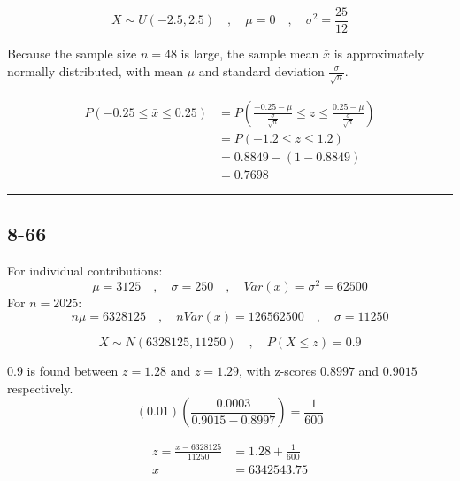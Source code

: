 \documentclass{article}
\newcommand{\qline}{\par\noindent\rule{4.5in}{1pt}}
\begin{document}
			\[
				X \sim U(-2.5,2.5) \quad,\quad \mu = 0 \quad,\quad \sigma^2 = \frac{25}{12}
			\]

			\begin{center}
				Because the sample size $n=48$ is large, the sample mean $\bar{x}$ is approximately normally distributed, with mean $\mu$ and standard deviation $\frac{\sigma}{\sqrt{n}}$.
			\end{center}

			\begin{equation*}
				\begin{split}
					 P(-0.25 \leq \bar{x} \leq 0.25) &= P\left( \frac{-0.25 - \mu}{\frac{\sigma}{\sqrt{n}}} \leq z \leq \frac{0.25 - \mu}{\frac{\sigma}{\sqrt{n}}} \right) \\
					 &= P(-1.2 \leq z \leq 1.2) \\
					 &= 0.8849 - (1 - 0.8849) \\
					 &= \boxed{\num{0.7698}}
				\end{split}
			\end{equation*}

	\qline

		\subsection*{8-66}

			\begin{center}
				For individual contributions:
				\[
					\mu = 3125 \quad,\quad \sigma = 250 \quad,\quad Var(x) = \sigma^2 = 62500
				\]
				For $n = 2025$:
				\[
					n\mu = 6328125 \quad,\quad nVar(x) = 126562500 \quad,\quad \sigma = 11250
				\]
			\end{center}

			\[
				X \sim N(6328125, 11250) \quad,\quad P(X \leq z) = 0.9
			\]
			\begin{center}
				$0.9$ is found between $z=1.28$ and $z=1.29$, with z-scores $0.8997$ and $0.9015$ respectively. \\
				\[
					(0.01)(\frac{0.0003}{0.9015-0.8997}) = \frac{1}{600}
				\]
			\end{center}
			\par
			\begin{equation*}
				\begin{split}
					z = \frac{x - 6328125}{11250} &= 1.28 + \frac{1}{600} \\
					x &= \boxed{\num{6342543.75}}
				\end{split}
			\end{equation*}
\end{document}
